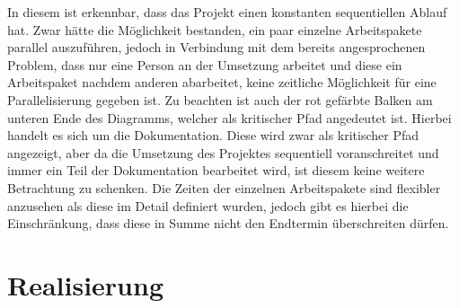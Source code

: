 In diesem ist erkennbar, dass das Projekt einen konstanten sequentiellen Ablauf hat.
Zwar hätte die Möglichkeit bestanden, ein paar einzelne Arbeitspakete parallel auszuführen, jedoch in Verbindung mit dem bereits angesprochenen Problem, dass nur eine Person an der Umsetzung arbeitet und diese ein Arbeitspaket nachdem anderen abarbeitet, keine zeitliche Möglichkeit für eine Parallelisierung gegeben ist.
Zu beachten ist auch der rot gefärbte Balken am unteren Ende des Diagramms, welcher als kritischer Pfad angedeutet ist. Hierbei handelt es sich um die Dokumentation. Diese wird zwar als kritischer Pfad angezeigt, aber da die Umsetzung des Projektes sequentiell voranschreitet und immer ein Teil der Dokumentation bearbeitet wird, ist diesem keine weitere Betrachtung zu schenken. Die Zeiten der einzelnen Arbeitspakete sind flexibler anzusehen als diese im Detail definiert wurden, jedoch gibt es hierbei die Einschränkung, dass diese in Summe nicht den Endtermin überschreiten dürfen.

\section{Realisierung}
\label{sec:implementation}

